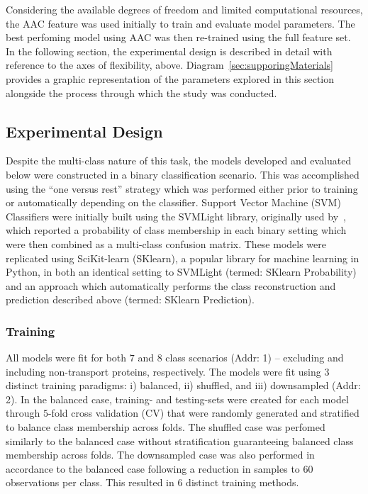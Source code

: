 Considering the available degrees of freedom and limited computational resources, the AAC feature was used initially
to train and evaluate model parameters. The best perfoming model using AAC was then re-trained using the full feature
set. In the following section, the experimental design is described in detail with reference to the axes of flexibility,
above. Diagram~\ref{sec:supporingMaterials} provides a graphic representation of the parameters explored in this
section alongside the process through which the study was conducted.

\subsection{Experimental Design}
\label{sec:experimentaldesign}
Despite the multi-class nature of this task, the models developed and evaluated below were constructed in a binary
classification scenario. This was accomplished using the ``one versus rest'' strategy which was performed either prior
to training or automatically depending on the classifier. Support Vector Machine (SVM) Classifiers were initially built
using the SVMLight library, originally used by~\citet{mishra2014prediction}, which reported a probability of class
membership in each binary setting which were then combined as a multi-class confusion matrix. These models were
replicated using SciKit-learn (SKlearn), a popular library for machine learning in Python, in both an identical setting
to SVMLight (termed: SKlearn Probability) and an approach which automatically performs the class reconstruction and
prediction described above (termed: SKlearn Prediction).

\subsubsection{Training}
All models were fit for both $7$ and $8$ class scenarios (Addr: 1) -- excluding and including non-transport proteins,
respectively. The models were fit using $3$ distinct training paradigms: i) balanced, ii) shuffled, and iii)
downsampled (Addr: 2). In the balanced case, training- and testing-sets were created for each model through $5$-fold
cross validation (CV) that were randomly generated and stratified to balance class membership across folds. The
shuffled case was perfomed similarly to the balanced case without stratification guaranteeing balanced class membership
across folds. The downsampled case was also performed in accordance to the balanced case following a reduction in
samples to $60$ observations per class. This resulted in $6$ distinct training methods.

